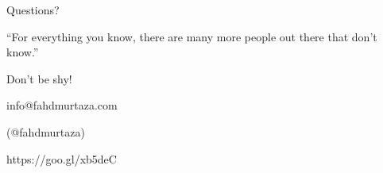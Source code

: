 \documentclass[10pt]{beamer}
\begin{document}
    \begin{frame}
        
    \end{frame}
    
    \begin{frame}[standout]
        \begin{Huge}
            Questions?
        \end{Huge}

        \vfill{}
        ``For everything you know, there are many more people out there that don't know.''
        
        \vfill{}
        \begin{large}
            Don't be shy!
        \end{large}

        \vfill{}

        \begin{center}
            info@fahdmurtaza.com 

            (@fahdmurtaza)

            https://goo.gl/xb5deC
        \end{center}
    \end{frame}
\end{document}
